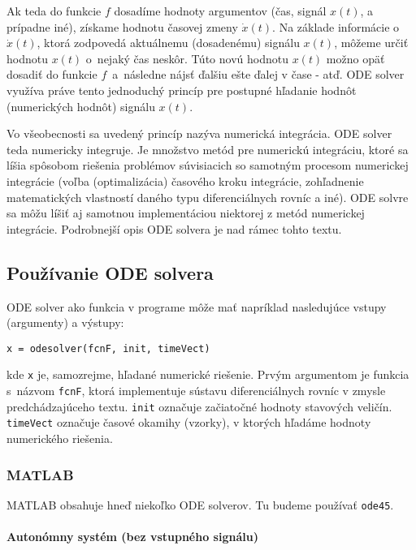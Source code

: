 \documentclass[a4paper, 10pt, ]{article}
\begin{document}
Ak teda do funkcie $f$ dosadíme hodnoty argumentov (čas, signál $x(t)$, a prípadne iné), získame hodnotu časovej zmeny $\dot x(t)$. Na základe informácie o $\dot x(t)$, ktorá zodpovedá aktuálnemu (dosadenému) signálu $x(t)$, môžeme určiť hodnotu $x(t)$ o~nejaký čas neskôr. Túto novú hodnotu $x(t)$ možno opäť dosadiť do funkcie $f$~a~následne nájsť ďalšiu ešte ďalej v čase - atď. ODE solver využíva práve tento jednoduchý princíp pre postupné hľadanie hodnôt (numerických hodnôt) signálu $x(t)$.


Vo všeobecnosti sa uvedený princíp nazýva numerická integrácia. ODE solver teda numericky integruje. Je množstvo metód pre numerickú integráciu, ktoré sa líšia spôsobom riešenia problémov súvisiacich so samotným procesom numerickej integrácie (voľba (optimalizácia) časového kroku integrácie, zohľadnenie matematických vlastností daného typu diferenciálnych rovníc a iné). ODE solvre sa môžu líšiť aj samotnou implementáciou niektorej z metód numerickej integrácie. Podrobnejší opis ODE solvera je nad rámec tohto textu.



\subsection{Používanie ODE solvera}

ODE solver ako funkcia v programe môže mať napríklad nasledujúce vstupy (argumenty) a výstupy:

\begin{verbatim}
x = odesolver(fcnF, init, timeVect)
\end{verbatim}
kde \verb|x| je, samozrejme, hľadané numerické riešenie. Prvým argumentom je funkcia s~názvom \verb|fcnF|, ktorá implementuje sústavu diferenciálnych rovníc v zmysle predchádzajúceho textu. \verb|init| označuje začiatočné hodnoty stavových veličín. \verb|timeVect| označuje časové okamihy (vzorky), v ktorých hľadáme hodnoty numerického riešenia.



\subsubsection{MATLAB}


MATLAB obsahuje hneď niekoľko ODE solverov. Tu budeme používať \verb|ode45|.


\paragraph{Autonómny systém (bez vstupného signálu)}
\end{document}
